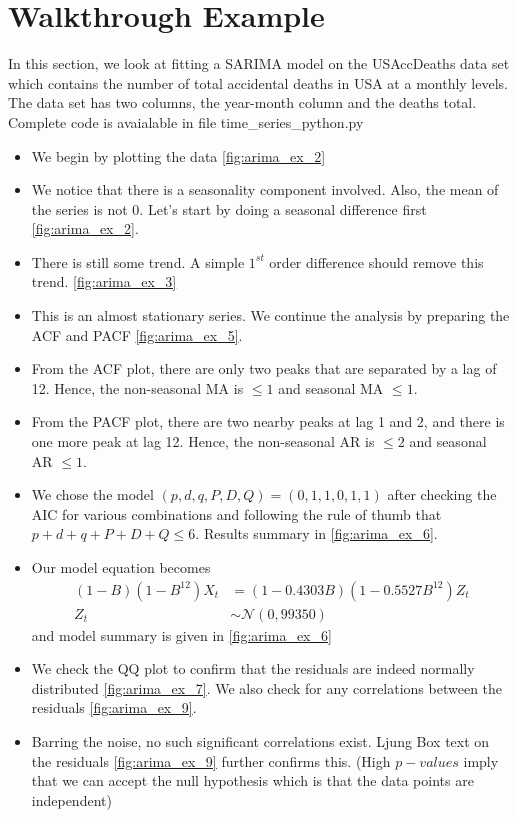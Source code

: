 \documentclass[../../time_series_notes.tex]{subfiles}
\begin{document}
\section{Walkthrough Example}
In this section, we look at fitting a SARIMA model on the USAccDeaths data set which contains the number of total accidental deaths in USA at a monthly levels. The data set has two columns, the year-month column and the deaths total. Complete code is avaialable in file time\_series\_python.py
\begin{itemize}
    \item We begin by plotting the data \ref{fig:arima_ex_2}
    \item We notice that there is a seasonality component involved. Also, the mean of the series is not 0. Let's start by doing a seasonal difference first \ref{fig:arima_ex_2}.
    \item There is still some trend. A simple $1^{st}$ order difference should remove this trend. \ref{fig:arima_ex_3}
    \item This is an almost stationary series. We continue the analysis by preparing the ACF and PACF \ref{fig:arima_ex_5}.
    \item From the ACF plot, there are only two peaks that are separated by a lag of 12. Hence, the non-seasonal MA is $\leq 1$ and seasonal MA $\leq 1$.
    \item From the PACF plot, there are two nearby peaks at lag 1 and 2, and there is one more peak at lag 12. Hence, the non-seasonal AR is $\leq 2$ and seasonal AR $\leq 1$.
    \item We chose the model $(p,d,q,P,D,Q) = (0,1,1,0,1,1)$ after checking the AIC for various combinations and following the rule of thumb that $p+d+q+P+D+Q \leq 6$. Results summary in \ref{fig:arima_ex_6}.
    \item Our model equation becomes
    \begin{align*}
        (1-B)(1-B^{12})X_{t} &= (1 - 0.4303B)(1 - 0.5527B^{12})Z_{t}\\
        Z_{t} &\sim \mathcal{N}(0, 99350)
    \end{align*}
    and model summary is given in \ref{fig:arima_ex_6}
    \item We check the QQ plot to confirm that the residuals are indeed normally distributed \ref{fig:arima_ex_7}. We also check for any correlations between the residuals \ref{fig:arima_ex_9}.
    \item Barring the noise, no such significant correlations exist. Ljung Box text on the residuals \ref{fig:arima_ex_9} further confirms this. (High $p-values$ imply that we can accept the null hypothesis which is that the data points are independent)
\end{itemize}
\end{document}
